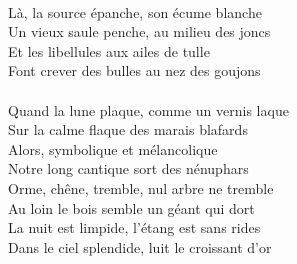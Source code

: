 \\Là, la source épanche, son écume blanche
\\Un vieux saule penche, au milieu des joncs
\\Et les libellules aux ailes de tulle
\\Font crever des bulles au nez des goujons
\\\\Quand la lune plaque, comme un vernis laque
\\Sur la calme flaque des marais blafards
\\Alors, symbolique et mélancolique
\\Notre long cantique sort des nénuphars
\\Orme, chêne, tremble, nul arbre ne tremble
\\Au loin le bois semble un géant qui dort
\\La nuit est limpide, l'étang est sans rides
\\Dans le ciel splendide, luit le croissant d'or
\breakpage